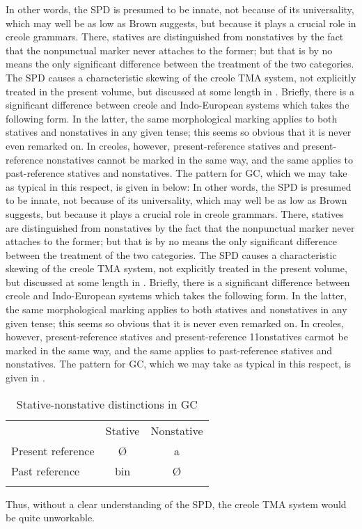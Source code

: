 In other words, the SPD is presumed to be innate, not because of its universality, which may well be as low as Brown suggests, but because it plays a crucial role in creole grammars. There, statives are distinguished from nonstatives by the fact that the nonpunctual marker never attaches to the former; but that is by no means the only signifi\-cant difference between the treatment of the two categories. The SPD causes a characteristic skewing of the creole TMA system, not explicitly treated in the present volume, but discussed at some length in \citet[Chapter 2]{Bickerton1975}. Briefly, there is a significant difference between creole and Indo-European systems which takes the following form. In the latter, the same morphological marking applies to both statives and nonstatives in any given tense; this seems so obvious that it is never even remarked on. In creoles, however, present-reference statives and present-reference nonstatives cannot be marked in the same way, and the same applies to past-reference statives and nonstatives. The pattern for GC, which we may take as typical in this respect, is given in  below:
In other words, the SPD is presumed to be innate, not because of its universality, which may well be as low as Brown suggests, but because it plays a crucial role in creole grammars. There, statives are distinguished from nonstatives by the fact that the nonpunctual marker never attaches to the former; but that is by no means the only signifi\-cant difference between the treatment of the two categories. The SPD causes a characteristic skewing of the creole TMA system, not explicitly treated in the present volume, but discussed at some length in \citet[Chapter 2]{Bickerton1975}. Briefly, there is a significant difference between creole and Indo-European systems which takes the following form. In the latter, the same morphological marking applies to both statives and nonstatives in any given tense; this seems so obvious that it is never even remarked on. In creoles, however, present-reference statives and present-reference 11onstatives carmot be marked in the same way, and the same applies to past-reference statives and nonstatives. The pattern for GC, which we may take as typical in this respect, is given in . %

\begin{table}
	\begin{tabular}{lcc}
	\lsptoprule
	& Stative & Nonstative \\
	Present reference & \O & a\\
	Past reference & bin & \O\\
	\lspbottomrule
	\end{tabular}
	\caption{Stative-nonstative distinctions in GC}\label{tab:3.1}
\end{table}
Thus, without a clear understanding of the SPD, the creole TMA system would be quite unworkable.

